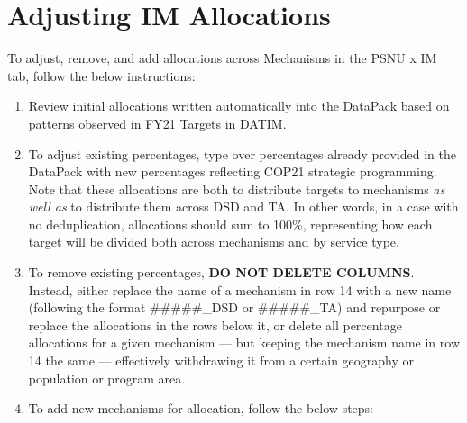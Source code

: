 \documentclass[
  openany]{book}
\begin{document}
\hypertarget{adjusting-im-allocations}{%
\section{Adjusting IM Allocations}\label{adjusting-im-allocations}}

To adjust, remove, and add allocations across Mechanisms in the PSNU x
IM tab, follow the below instructions:

\begin{enumerate}
\def\labelenumi{\arabic{enumi})}
\item
  Review initial allocations written automatically into the DataPack
  based on patterns observed in FY21 Targets in DATIM.
\item
  To adjust existing percentages, type over percentages already
  provided in the DataPack with new percentages reflecting COP21
  strategic programming. Note that these allocations are both to
  distribute targets to mechanisms \emph{as well as} to distribute them
  across DSD and TA. In other words, in a case with no deduplication,
  allocations should sum to 100\%, representing how each target will be
  divided both across mechanisms and by service type.
\item
  To remove existing percentages, \textbf{DO NOT DELETE COLUMNS}. Instead,
  either replace the name of a mechanism in row 14 with a new name
  (following the format \#\#\#\#\#\_DSD or \#\#\#\#\#\_TA) and repurpose or
  replace the allocations in the rows below it, or delete all
  percentage allocations for a given mechanism --- but keeping the
  mechanism name in row 14 the same --- effectively withdrawing it
  from a certain geography or population or program area.
\item
  To add new mechanisms for allocation, follow the below steps:


\end{enumerate}
\end{document}
